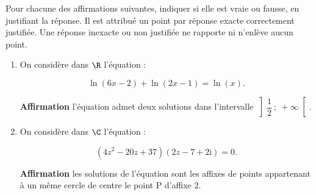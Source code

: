 \documentclass{cornouaille}
\begin{document}
\begin{exercice}
Pour chacune des  affirmations suivantes,
 indiquer si elle est vraie ou fausse, 
en justifiant la réponse.
 Il est attribué un point par réponse exacte correctement justifiée.
 Une réponse inexacte ou
non justifiée ne rapporte ni n'enlève aucun point.

\begin{enumerate}

\item  On considère dans $\R$ l'équation :

\[\ln (6 x - 2) + \ln (2x - 1) = \ln (x).\]



\textbf{Affirmation} l'équation admet deux solutions dans l'intervalle $\left]\dfrac{1}{2}~;~+ \infty\right[$.
\item  On considère dans $\C$ l'équation : 

\[\left(4z^2 - 20z + 37\right)(2z -7 + 2\text{i}) = 0.\]



\textbf{Affirmation} les solutions de l'équation sont les affixes de points appartenant à un même
cercle de centre le point P d'affixe $2$.
\end{enumerate}
\end{exercice}
\end{document}

